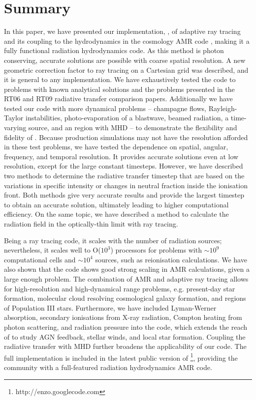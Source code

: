 \documentclass[useAMS,usenatbib]{mn2e}
\begin{document}
\section{Summary}

In this paper, we have presented our implementation, \moray, of
adaptive ray tracing \citep{Abel02_RT} and its coupling to the
hydrodynamics in the cosmology AMR code \enzo, making it a fully
functional radiation hydrodynamics code.  As this method is photon
conserving, accurate solutions are possible with coarse spatial
resolution.  A new geometric correction factor to ray tracing on a
Cartesian grid was described, and it is general to any implementation.
We have exhaustively tested the code to problems with known analytical
solutions and the problems presented in the RT06 and RT09 radiative
transfer comparison papers.  Additionally we have tested our code with
more dynamical problems -- champagne flows, Rayleigh-Taylor
instabilities, photo-evaporation of a blastwave, beamed radiation, a
time-varying source, and an \hii region with MHD -- to
demonstrate the flexibility and fidelity of \moray.  Because
production simulations may not have the resolution afforded in these
test problems, we have tested the dependence on spatial, angular,
frequency, and temporal resolution.  It provides accurate solutions
even at low resolution, except for the large constant timesteps.
However, we have described two methods to determine the radiative
transfer timestep that are based on the variations in specific
intensity or changes in neutral fraction inside the ionisation front.
Both methods give very accurate results and provide the largest
timestep to obtain an accurate solution, ultimately leading to higher
computational efficiency.  On the same topic, we have described a
method to calculate the radiation field in the optically-thin limit
with ray tracing.

Being a ray tracing code, it scales with the number of radiation
sources; nevertheless, it scales well to O($10^3$) processors for
problems with $\sim10^9$ computational cells and $\sim10^4$ sources,
such as reionisation calculations.  We have also shown that the code
shows good strong scaling in AMR calculations, given a large enough
problem.  The combination of AMR and adaptive ray tracing allows for
high-resolution and high-dynamical range problems, e.g. present-day
star formation, molecular cloud resolving cosmological galaxy
formation, and \hii regions of Population III stars.  Furthermore, we
have included Lyman-Werner absorption, secondary ionisations from
X-ray radiation, Compton heating from photon scattering, and radiation
pressure into the code, which extends the reach of \moray to study
AGN feedback, stellar winds, and local star formation.  Coupling the
radiative transfer with MHD further broadens the applicability of our
code.  The full implementation is included in the latest public
version of \enzo\footnote{http://enzo.googlecode.com}, providing the
community with a full-featured radiation hydrodynamics AMR code.
\end{document}
